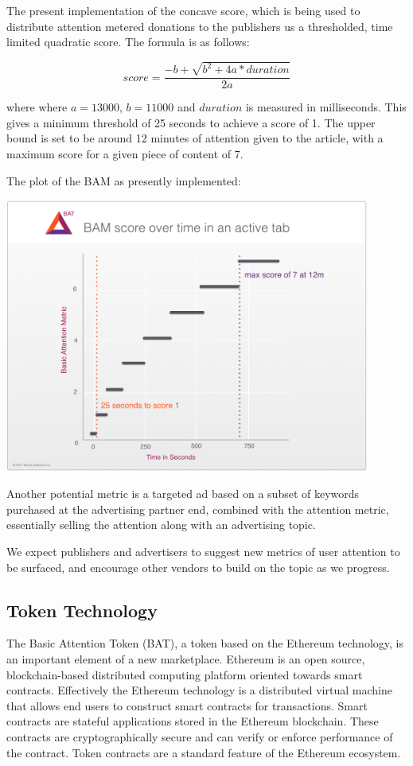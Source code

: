 \documentclass[11pt]{article}
\begin{document}
The present implementation of the concave score, which is being used to distribute attention metered donations to the publishers us a thresholded, time limited quadratic score. The formula is as follows:

\[ score= \frac{-b + \sqrt{b^2 + 4a*duration}}{2a}\]

where where $a=13000$, $b=11000 $ and $duration$ is measured in
milliseconds. This gives a minimum threshold of 25 seconds to achieve
a score of 1. The upper bound is set to be around 12 minutes of
attention given to the article, with a maximum score for a given piece
of content of 7. 

The plot of the BAM as presently implemented:

\begin{center}
\includegraphics[width=0.9\textwidth]{BAM_score_over_time.png}
\end{center}

Another potential metric is a targeted ad based on a subset of keywords purchased at the advertising partner end, combined with the attention metric, essentially selling the attention along with an advertising topic. 

We expect publishers and advertisers to suggest new metrics of user attention to be surfaced, and encourage other vendors to build on the topic as we progress.
\subsection{Token Technology}
\label{sec-4-2}

The Basic Attention Token (BAT), a token based on the Ethereum technology, is an important element of a new marketplace. Ethereum is an open source, blockchain-based distributed computing platform oriented towards smart contracts. Effectively the Ethereum technology is a distributed virtual machine that allows end users to construct smart contracts for transactions. Smart contracts are stateful applications stored in the Ethereum blockchain. These contracts are cryptographically secure and can verify or enforce performance of the contract. Token contracts are a standard feature of the Ethereum ecosystem.
\end{document}

